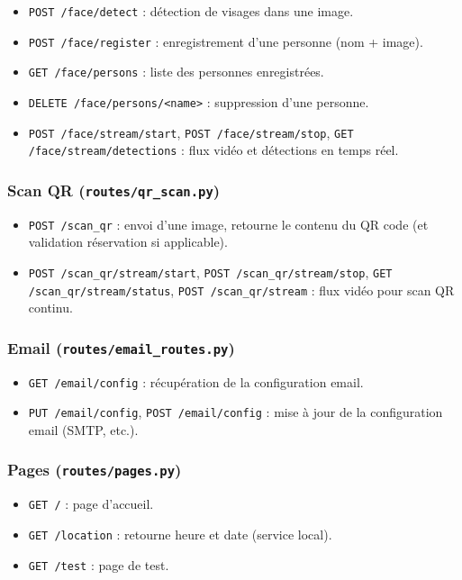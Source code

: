 \documentclass[12pt,a4paper]{article}
\begin{document}
\begin{itemize}[noitemsep]
  \item \texttt{POST /face/detect} : détection de visages dans une image.
  \item \texttt{POST /face/register} : enregistrement d'une personne (nom + image).
  \item \texttt{GET /face/persons} : liste des personnes enregistrées.
  \item \texttt{DELETE /face/persons/<name>} : suppression d'une personne.
  \item \texttt{POST /face/stream/start}, \texttt{POST /face/stream/stop}, \texttt{GET /face/stream/detections} : flux vidéo et détections en temps réel.
\end{itemize}

\subsubsection{Scan QR (\texttt{routes/qr\_scan.py})}

\begin{itemize}[noitemsep]
  \item \texttt{POST /scan\_qr} : envoi d'une image, retourne le contenu du QR code (et validation réservation si applicable).
  \item \texttt{POST /scan\_qr/stream/start}, \texttt{POST /scan\_qr/stream/stop}, \texttt{GET /scan\_qr/stream/status}, \texttt{POST /scan\_qr/stream} : flux vidéo pour scan QR continu.
\end{itemize}

\subsubsection{Email (\texttt{routes/email\_routes.py})}

\begin{itemize}[noitemsep]
  \item \texttt{GET /email/config} : récupération de la configuration email.
  \item \texttt{PUT /email/config}, \texttt{POST /email/config} : mise à jour de la configuration email (SMTP, etc.).
\end{itemize}

\subsubsection{Pages (\texttt{routes/pages.py})}

\begin{itemize}[noitemsep]
  \item \texttt{GET /} : page d'accueil.
  \item \texttt{GET /location} : retourne heure et date (service local).
  \item \texttt{GET /test} : page de test.
\end{itemize}
\end{document}
